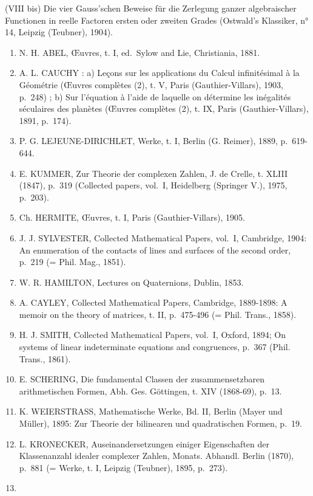 (VIII bis) Die vier Gauss'schen Beweise für die Zerlegung ganzer algebraischer Functionen in reelle Factoren ersten oder zweiten Grades (Ostwald's Klassiker, n° 14, Leipzig (Teubner), 1904).

\begin{enumerate}
\def\labelenumi{(\Roman{enumi})}
\setcounter{enumi}{8}
\item
  N. H. ABEL, Œuvres, t. I, ed.~Sylow and Lie, Christiania, 1881.
\item
  A. L. CAUCHY : a) Leçons sur les applications du Calcul infinitésimal à la Géométrie (Œuvres complètes (2), t. V, Paris (Gauthier-Villars), 1903, p.~248) ; b) Sur l'équation à l'aide de laquelle on détermine les inégalités séculaires des planètes (Œuvres complètes (2), t. IX, Paris (Gauthier-Villars), 1891, p.~174).
\item
  P. G. LEJEUNE-DIRICHLET, Werke, t. I, Berlin (G. Reimer), 1889, p.~619-644.
\item
  E. KUMMER, Zur Theorie der complexen Zahlen, J. de Crelle, t. XLIII (1847), p.~319 (Collected papers, vol.~I, Heidelberg (Springer V.), 1975, p.~203).
\item
  Ch. HERMITE, Œuvres, t. I, Paris (Gauthier-Villars), 1905.
\item
  J. J. SYLVESTER, Collected Mathematical Papers, vol.~I, Cambridge, 1904: An enumeration of the contacts of lines and surfaces of the second order, p.~219 (= Phil. Mag., 1851).
\item
  W. R. HAMILTON, Lectures on Quaternions, Dublin, 1853.
\item
  A. CAYLEY, Collected Mathematical Papers, Cambridge, 1889-1898: A memoir on the theory of matrices, t. II, p.~475-496 (= Phil. Trans., 1858).
\item
  H. J. SMITH, Collected Mathematical Papers, vol.~I, Oxford, 1894; On systems of linear indeterminate equations and congruences, p.~367 (Phil. Trans., 1861).
\item
  E. SCHERING, Die fundamental Classen der zusammensetzbaren arithmetischen Formen, Abh. Ges. Göttingen, t. XIV (1868-69), p.~13.
\item
  K. WEIERSTRASS, Mathematische Werke, Bd. II, Berlin (Mayer und Müller), 1895: Zur Theorie der bilinearen und quadratischen Formen, p.~19.
\item
  L. KRONECKER, Auseinandersetzungen einiger Eigenschaften der Klassenanzahl idealer complexer Zahlen, Monats. Abhandl. Berlin (1870), p.~881 (= Werke, t. I, Leipzig (Teubner), 1895, p.~273).
\item

\end{enumerate}
